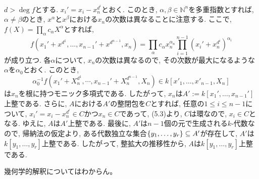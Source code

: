 \documentclass[dvipdfmx]{jsarticle}
\begin{document}
\begin{problem}
\begin{enumerate}
            $d > \deg{f}$とする.
            $x_i' = x_i - x_n^{d^i}$とおく.
            このとき, $\alpha, \beta \in \mathbb{N}^n$を多重指数とすれば,
            $\alpha \neq \beta$のとき, $x^\alpha$と$x^\beta$における$x_n$の次数は異なることに注意する.
            ここで, $f(X) = \prod_{\alpha} c_{\alpha} X^\alpha$とすれば,
            \[
                f(x_1' + x^{d^1}, \dots, x_{n-1}' + x^{d^{n-1}}, x_n) = \prod_{\alpha} c_\alpha x_n^{\alpha_n} \prod_{i = 1}^{n-1} (x_i' + x_n^{d^i})^{\alpha_i}
            \]
            が成り立つ.
            各$\alpha$について, $x_n$の次数は異なるので, その次数が最大になるような$\alpha$を$\alpha_0$とおく.
            このとき,
            \[
                \alpha_0^{-1}f(x_1' + X^{d^1}_n, \cdots, x_{n-1}' + X_n^{d^{n-1}}, X_n) \in k[x'_1,\dots,x'_{n-1}, X_n]
            \]
            は$x_n$を根に持つモニック多項式である.
            したがって, $x_n$は$A' := k[x_1', \dots, x_{n-1}']$上整である.
            さらに, $A$における$A'$の整閉包を$C$とすれば,
            任意の$1 \leq i \leq n-1$について,
            $x_i' = x_i - x_n^{d^i} \in C$かつ$x_n \in C$であって, (5.3)より, $C$は環なので,
            $x_i \in C$となる.
            ゆえに, $A$は$A'$上整である.
            最後に, $A'$は$n-1$個の元で生成される$k$-代数なので, 帰納法の仮定より,
            ある代数独立な集合$\{y_1, \dots, y_r\} \subseteq A'$が存在して,
            $A'$は$k[y_1, \dots, y_r]$上整である.
            したがって, 整拡大の推移性から, $A$は$k[y_1, \dots, y_r]$上整である.
        \end{enumerate}
        \color{red}
        幾何学的解釈についてはわからん。
        \color{black}
    \end{problem}
\end{document}
